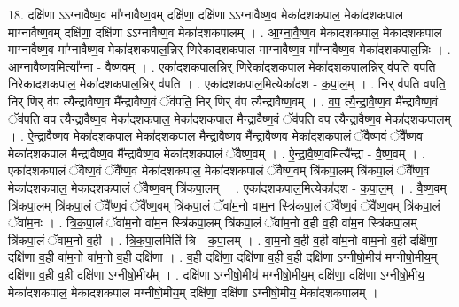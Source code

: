 \documentclass[17pt]{extarticle}
\begin{document}
18. दक्षि॑णा ऽऽग्नावैष्ण॒व मा᳚ग्नावैष्ण॒वम् दक्षि॑णा॒ दक्षि॑णा ऽऽग्नावैष्ण॒व मेका॑दशकपाल॒ मेका॑दशकपाल माग्नावैष्ण॒वम् दक्षि॑णा॒ दक्षि॑णा ऽऽग्नावैष्ण॒व मेका॑दशकपालम् । . आ॒ग्ना॒वै॒ष्ण॒व मेका॑दशकपाल॒ मेका॑दशकपाल माग्नावैष्ण॒व मा᳚ग्नावैष्ण॒व मेका॑दशकपाल॒न्निर् णिरेका॑दशकपाल माग्नावैष्ण॒व मा᳚ग्नावैष्ण॒व मेका॑दशकपाल॒न्निः । . आ॒ग्ना॒वै॒ष्ण॒वमित्या᳚ग्ना - वै॒ष्ण॒वम् । . एका॑दशकपाल॒न्निर् णिरेका॑दशकपाल॒ मेका॑दशकपाल॒न्निर् व॑पति वपति॒ निरेका॑दशकपाल॒ मेका॑दशकपाल॒न्निर् व॑पति । . एका॑दशकपाल॒मित्येका॑दश - क॒पा॒ल॒म् । . निर् व॑पति वपति॒ निर् णिर् व॑प त्यैन्द्रावैष्ण॒व मै᳚न्द्रावैष्ण॒वं ॅव॑पति॒ निर् णिर् व॑प त्यैन्द्रावैष्ण॒वम् । . व॒प॒ त्यै॒न्द्रा॒वै॒ष्ण॒व मै᳚न्द्रावैष्ण॒वं ॅव॑पति वप त्यैन्द्रावैष्ण॒व मेका॑दशकपाल॒ मेका॑दशकपाल मैन्द्रावैष्ण॒वं ॅव॑पति वप त्यैन्द्रावैष्ण॒व मेका॑दशकपालम् । . ऐ॒न्द्रा॒वै॒ष्ण॒व मेका॑दशकपाल॒ मेका॑दशकपाल मैन्द्रावैष्ण॒व मै᳚न्द्रावैष्ण॒व मेका॑दशकपालं ॅवैष्ण॒वं ॅवै᳚ष्ण॒व मेका॑दशकपाल मैन्द्रावैष्ण॒व मै᳚न्द्रावैष्ण॒व मेका॑दशकपालं ॅवैष्ण॒वम् । . ऐ॒न्द्रा॒वै॒ष्ण॒वमित्यै᳚न्द्रा - वै॒ष्ण॒वम् । . एका॑दशकपालं ॅवैष्ण॒वं ॅवै᳚ष्ण॒व मेका॑दशकपाल॒ मेका॑दशकपालं ॅवैष्ण॒वम् त्रि॑कपा॒लम् त्रि॑कपा॒लं ॅवै᳚ष्ण॒व मेका॑दशकपाल॒ मेका॑दशकपालं ॅवैष्ण॒वम् त्रि॑कपा॒लम् । . एका॑दशकपाल॒मित्येका॑दश - क॒पा॒ल॒म् । . वै॒ष्ण॒वम् त्रि॑कपा॒लम् त्रि॑कपा॒लं ॅवै᳚ष्ण॒वं ॅवै᳚ष्ण॒वम् त्रि॑कपा॒लं ॅवा॑म॒नो वा॑म॒न स्त्रि॑कपा॒लं ॅवै᳚ष्ण॒वं ॅवै᳚ष्ण॒वम् त्रि॑कपा॒लं ॅवा॑म॒नः । . त्रि॒क॒पा॒लं ॅवा॑म॒नो वा॑म॒न स्त्रि॑कपा॒लम् त्रि॑कपा॒लं ॅवा॑म॒नो व॒ही व॒ही वा॑म॒न स्त्रि॑कपा॒लम् त्रि॑कपा॒लं ॅवा॑म॒नो व॒ही । . त्रि॒क॒पा॒लमिति॑ त्रि - क॒पा॒लम् । . वा॒म॒नो व॒ही व॒ही वा॑म॒नो वा॑म॒नो व॒ही दक्षि॑णा॒ दक्षि॑णा व॒ही वा॑म॒नो वा॑म॒नो व॒ही दक्षि॑णा । . व॒ही दक्षि॑णा॒ दक्षि॑णा व॒ही व॒ही दक्षि॑णा ऽग्नीषो॒मीय॑ मग्नीषो॒मीय॒म् दक्षि॑णा व॒ही व॒ही दक्षि॑णा ऽग्नीषो॒मीय᳚म् । . दक्षि॑णा ऽग्नीषो॒मीय॑ मग्नीषो॒मीय॒म् दक्षि॑णा॒ दक्षि॑णा ऽग्नीषो॒मीय॒ मेका॑दशकपाल॒ मेका॑दशकपाल मग्नीषो॒मीय॒म् दक्षि॑णा॒ दक्षि॑णा ऽग्नीषो॒मीय॒ मेका॑दशकपालम् । \newline
\end{document}
